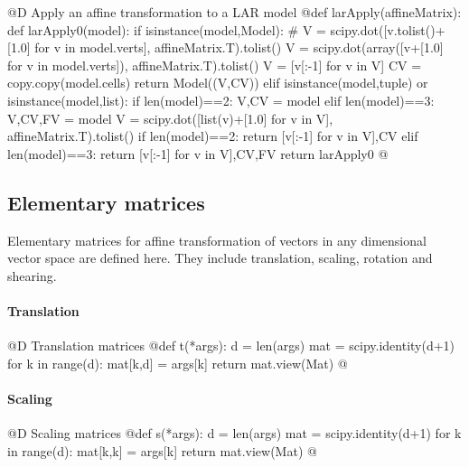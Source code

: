 \documentclass[11pt,oneside]{article}    %
\begin{document}
@D Apply an affine transformation to a LAR model 
@{def larApply(affineMatrix):
    def larApply0(model):
        if isinstance(model,Model):
            # V = scipy.dot([v.tolist()+[1.0] for v in model.verts], affineMatrix.T).tolist()
            V = scipy.dot(array([v+[1.0] for v in model.verts]), affineMatrix.T).tolist()
            V = [v[:-1] for v in V]
            CV = copy.copy(model.cells)
            return Model((V,CV))
        elif isinstance(model,tuple) or isinstance(model,list):
            if len(model)==2: V,CV = model
            elif len(model)==3: V,CV,FV = model
            V = scipy.dot([list(v)+[1.0] for v in V], affineMatrix.T).tolist()
            if len(model)==2: return [v[:-1] for v in V],CV
            elif len(model)==3: return [v[:-1] for v in V],CV,FV
    return larApply0
@}


\subsection{Elementary matrices}
Elementary matrices for affine transformation of vectors in any dimensional vector space are defined here. They include translation, scaling, rotation and shearing. 

\paragraph{Translation}
@D Translation matrices
@{def t(*args): 
    d = len(args)
    mat = scipy.identity(d+1)
    for k in range(d): 
        mat[k,d] = args[k]
    return mat.view(Mat)
@}
\paragraph{Scaling}
@D Scaling matrices
@{def s(*args): 
    d = len(args)
    mat = scipy.identity(d+1)
    for k in range(d): 
        mat[k,k] = args[k]
    return mat.view(Mat)
@}
\end{document}
